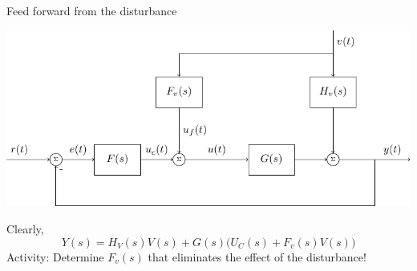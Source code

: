 \documentclass[presentation,aspectratio=169, usenames, dvipsnames]{beamer}
\begin{document}
\begin{frame}[label={sec:org2551c79}]{Feed forward from the disturbance}
\begin{center}
\includegraphics[width=0.7\linewidth]{../../figures/block-diagram-ffw}
\end{center}

Clearly,
\[ Y(s) = H_V(s)V(s) + G(s)\Big(U_C(s) + F_v(s)V(s)\Big)\]
\alert{Activity: Determine \(F_v(s)\) that eliminates the effect of the disturbance!}
\end{frame}
\end{document}

